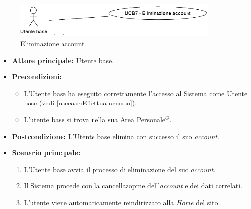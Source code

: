 \newpage
{}
\label{usecase:Eliminazione account}

\begin{figure}[h]
	\centering
	\includegraphics[width=0.9\textwidth]{./uml/UCB7.png} 
	\caption{Eliminazione account}
	\label{fig:UCB7}
  \end{figure}

\begin{itemize}
	\item \textbf{Attore principale:} Utente base.

	\item \textbf{Precondizioni:}
	      \begin{itemize}
		      \item L'Utente base ha eseguito correttamente l'accesso al Sistema come Utente base (vedi \autoref{usecase:Effettua accesso}).
		      \item L'utente base si trova nella sua Area Personale$^G$.
	      \end{itemize}

	\item \textbf{Postcondizione:} L'Utente base elimina con successo il suo \textit{account}.

	\item \textbf{Scenario principale:}
	      \begin{enumerate}
		      \item L'Utente base avvia il processo di eliminazione del suo \textit{account}.
		      \item Il Sistema procede con la cancellazopme dell'\textit{account} e dei dati correlati.
		      \item L'utente viene automaticamente reindirizzato alla \textit{Home} del sito.
	      \end{enumerate}
\end{itemize}
